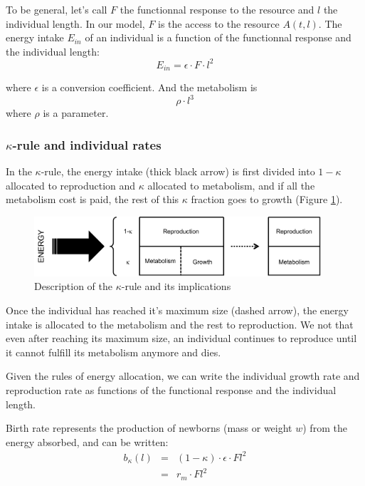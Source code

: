 To be general, let's call $F$ the functionnal response to the resource and $l$
the individual length. In our model, $F$ is the access to the resource
$A(t,l)$.
The energy intake $E_{in}$ of an individual is a function of the functionnal
response and the individual length:
\[ E_{in}=\epsilon\cdot F\cdot l^{2} \]

where $\epsilon$ is a conversion coefficient. And the metabolism
is 
\[
\rho\cdot l^{3}
\]
 where $\rho$ is a parameter. 

\subsubsection*{$\kappa$-rule and individual rates}\label{subsubsec:SupMat21}


In the $\kappa$-rule, the energy intake (thick black arrow) is first
divided into $1-\kappa$ allocated to reproduction and $\kappa$ allocated
to metabolism, and if all the metabolism cost is paid, the rest of
this $\kappa$ fraction goes to growth (Figure \ref{Fig4-SM5}). 

\begin{figure}[ht] %
\centering
\includegraphics[width=0.95\textwidth]{4_ChapThe1/Fig/KRule}
\caption[Details of the
$\kappa$-rule]{Description of the $\kappa$-rule and its implications}
\label{Fig4-SM5}
\end{figure}

Once the individual has reached
it's maximum size (dashed arrow), the energy intake is allocated to
the metabolism and the rest to reproduction. We not that even after
reaching its maximum size, an individual continues to reproduce until
it cannot fulfill its metabolism anymore and dies.

Given the rules of energy allocation, we can write the individual
growth rate and reproduction rate as functions of the functional response
and the individual length.

Birth rate represents the production of newborns (mass or weight $w$)
from the energy absorbed, and can be written:
\begin{eqnarray*}
b_{\kappa}(l) & = & (1-\kappa)\cdot\epsilon\cdot Fl^{2}\\
 & = & r_{m}\cdot Fl^{2}
\end{eqnarray*}


